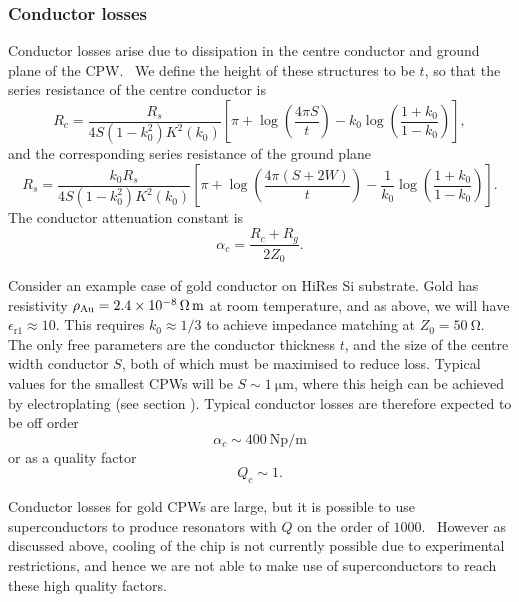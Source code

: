 \subsubsection*{Conductor losses}

Conductor losses arise due to dissipation in the centre conductor and ground
plane of the CPW.~\cite{Simons2004} We define the height of these structures to
be $t$, so that the series resistance of the centre conductor is
\begin{equation}
  R_c = \frac{R_s}{4 S(1-k_0^2)K^2(k_0)}\left[ \pi + \log\left(\frac{4\pi
  S}{t}\right) - k_0\log\left(\frac{1+k_0}{1-k_0}\right) \right],
\end{equation}
and the corresponding series resistance of the ground plane
\begin{equation}
  R_s = \frac{k_0 R_s}{4S(1-k_0^2)K^2(k_0)}\left[\pi +
  \log\left(\frac{4\pi(S+2W)}{t}\right) -
  \frac{1}{k_0}\log\left(\frac{1+k_0}{1-k_0}\right)\right].
\end{equation}
The conductor attenuation constant is
\begin{equation}
  \alpha_c = \frac{R_c +R_g}{2Z_0}.
\end{equation}

Consider an example case of gold conductor on HiRes Si substrate. Gold has
resistivity $\rho_\mathrm{Au} = \SI{2.4E-8}{\ohm\metre}$ at room temperature,
and as above, we will have $\epsilon_\mathrm{r1} \approx 10$. This requires $k_0
\approx 1/3$ to achieve impedance matching at $Z_0 = \SI{50}{\ohm}$. The only
free parameters are the conductor thickness $t$, and the size of the centre
width conductor $S$, both of which must be maximised to reduce loss. Typical
values for the smallest CPWs will be $S\sim\SI{1}{\micro\metre}$, where
this heigh can be achieved by electroplating (see section ). Typical
conductor losses are therefore expected to be off order
\begin{equation}
  \alpha_c \sim \SI{400}{\neper\per\metre}
\end{equation}
or as a quality factor
\begin{equation}
  Q_c \sim 1.
\end{equation}

Conductor losses for gold CPWs are large, but it is possible to use
superconductors to produce resonators with $Q$ on the order of
$1000$.~\cite{Booth1999, Wallraff2004} However as discussed above, cooling of
the chip is not currently possible due to experimental restrictions, and hence
we are not able to make use of superconductors to reach these high quality
factors.

